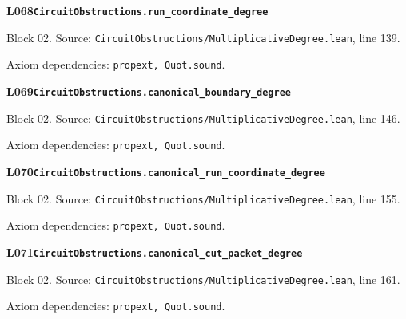\begin{minipage}{\linewidth}
\hypertarget{L068}{}
{\small\sffamily\bfseries\color{ink}L068\quad\nolinkurl{CircuitObstructions.run_coordinate_degree}}\par
{\scriptsize\sffamily\color{muted}Block 02. Source: \nolinkurl{CircuitObstructions/MultiplicativeDegree.lean}, line 139.}\par
{}
{\scriptsize\sffamily\color{muted}Axiom dependencies: \nolinkurl{propext, Quot.sound}.}
\end{minipage}\par\medskip
\begin{minipage}{\linewidth}
\hypertarget{L069}{}
{\small\sffamily\bfseries\color{ink}L069\quad\nolinkurl{CircuitObstructions.canonical_boundary_degree}}\par
{\scriptsize\sffamily\color{muted}Block 02. Source: \nolinkurl{CircuitObstructions/MultiplicativeDegree.lean}, line 146.}\par
{}
{\scriptsize\sffamily\color{muted}Axiom dependencies: \nolinkurl{propext, Quot.sound}.}
\end{minipage}\par\medskip
\begin{minipage}{\linewidth}
\hypertarget{L070}{}
{\small\sffamily\bfseries\color{ink}L070\quad\nolinkurl{CircuitObstructions.canonical_run_coordinate_degree}}\par
{\scriptsize\sffamily\color{muted}Block 02. Source: \nolinkurl{CircuitObstructions/MultiplicativeDegree.lean}, line 155.}\par
{}
{\scriptsize\sffamily\color{muted}Axiom dependencies: \nolinkurl{propext, Quot.sound}.}
\end{minipage}\par\medskip
\begin{minipage}{\linewidth}
\hypertarget{L071}{}
{\small\sffamily\bfseries\color{ink}L071\quad\nolinkurl{CircuitObstructions.canonical_cut_packet_degree}}\par
{\scriptsize\sffamily\color{muted}Block 02. Source: \nolinkurl{CircuitObstructions/MultiplicativeDegree.lean}, line 161.}\par
{}
{\scriptsize\sffamily\color{muted}Axiom dependencies: \nolinkurl{propext, Quot.sound}.}
\end{minipage}\par\medskip

